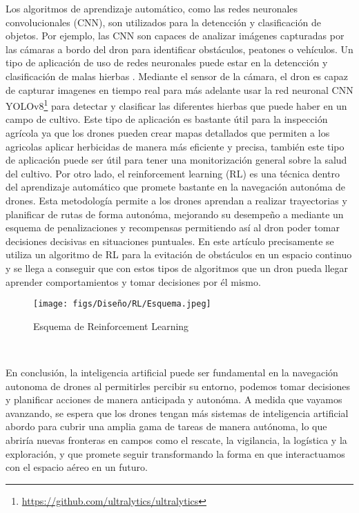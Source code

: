 Los algoritmos de aprendizaje automático, como las redes neuronales convolucionales (CNN), son utilizados para la detencción y clasificación
de objetos. Por ejemplo, las CNN son capaces de analizar imágenes capturadas por las cámaras a bordo del dron para identificar obstáculos, 
peatones o vehículos. Un tipo de aplicación de uso de redes neuronales puede estar en la detencción y clasificación de malas hierbas \cite{CSIC}. Mediante el sensor de la cámara, el dron es capaz de capturar imagenes en tiempo real 
para más adelante usar la red neuronal CNN YOLOv8\footnote{\url{https://github.com/ultralytics/ultralytics}} para detectar y clasificar las diferentes hierbas que puede haber en un campo de cultivo. Este tipo de aplicación es bastante útil para la inspección
agrícola ya que los drones pueden crear mapas detallados que permiten a los agricolas aplicar herbicidas de manera más eficiente y precisa, también este tipo de aplicación puede
ser útil para tener una monitorización general sobre la salud del cultivo. \newline 
Por otro lado, el reinforcement learning (RL) \cite{6025669} es una técnica dentro del aprendizaje automático que promete bastante en la navegación autonóma de drones. Esta metodología permite
a los drones aprendan a realizar trayectorias y planificar de rutas de forma autonóma, mejorando su desempeño a mediante un esquema de penalizaciones y recompensas permitiendo
así al dron poder tomar decisiones decisivas en situaciones puntuales. En este artículo 
\cite{ai2030023} precisamente se utiliza un algoritmo de RL para la evitación de obstáculos en un espacio continuo y se llega a conseguir que con estos
tipos de algoritmos que un dron pueda llegar aprender comportamientos y tomar decisiones por él mismo. 

\begin{figure} [H]
  \begin{center}
    \texttt{[image: figs/Diseño/RL/Esquema.jpeg]}
  \end{center}
  \caption{Esquema de Reinforcement Learning}
  \label{fig:Reinforcement Learning}
\end{figure}\



En conclusión, la inteligencia artificial puede ser fundamental en la navegación autonoma de drones al permitirles percibir su entorno, podemos tomar decisiones y planificar acciones 
de manera anticipada y autonóma. A medida que vayamos avanzando, se espera que los drones tengan más sistemas de inteligencia artificial abordo para cubrir una amplia gama de tareas
de manera autónoma, lo que abriría nuevas fronteras en campos como el rescate, la vigilancia, la logística y la exploración, y que promete seguir transformando la forma en que 
interactuamos con el espacio aéreo en un futuro. 

